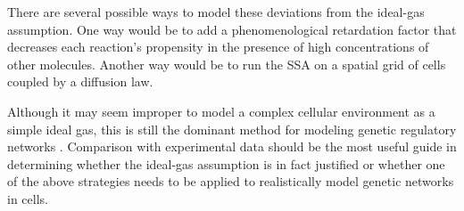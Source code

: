 \documentclass[english,letterpaper,12pt]{article}
\begin{document}
\begin{doublespacing}
There are several possible ways to model these deviations from the ideal-gas assumption. One way would be to add a phenomenological retardation factor that decreases each reaction's propensity in the presence of high concentrations of other molecules. Another way would be to run the SSA on a spatial grid of cells coupled by a diffusion law.

Although it may seem improper to model a complex cellular environment as a simple ideal gas, this is still the dominant method for modeling genetic regulatory networks . Comparison with experimental data should be the most useful guide in determining whether the ideal-gas assumption is in fact justified or whether one of the above strategies needs to be applied to realistically model genetic networks in cells.



\end{doublespacing}

\appendix



\end{document}
